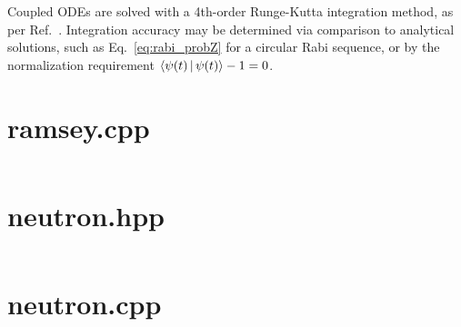 %
Coupled ODEs are solved with a 4th-order Runge-Kutta integration method, as per Ref.~\cite{numerical_recipes}. Integration accuracy may be determined via comparison to analytical solutions, such as Eq.~\ref{eq:rabi_probZ} for a circular Rabi sequence, or by the normalization requirement $\Braket{\psi(t) | \psi(t)} - 1 = 0$.

\section{ramsey.cpp}

\inputminted{cpp}{code_snippets/ramsey.cpp}

\section{neutron.hpp}

\inputminted{cpp}{code_snippets/neutron.hpp}

\section{neutron.cpp}

\inputminted{cpp}{code_snippets/neutron.cpp}